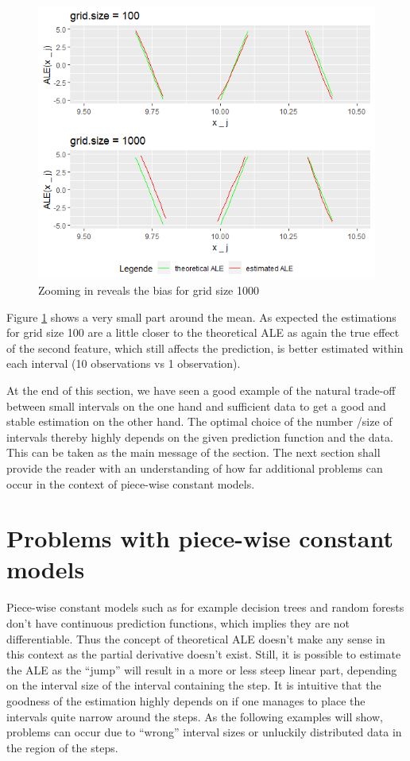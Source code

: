 \documentclass[]{krantz}
\begin{document}
\begin{figure}
\includegraphics[width=1\linewidth]{images/ALE_2_example3_zoom_} \caption{Zooming in reveals the bias for grid size 1000}\label{fig:example3zoom}
\end{figure}



Figure \ref{fig:example3zoom} shows a very small part around the mean.
As expected the estimations for grid size 100 are a little closer to the
theoretical ALE as again the true effect of the second feature, which
still affects the prediction, is better estimated within each interval
(10 observations vs 1 observation).

At the end of this section, we have seen a good example of the natural
trade-off between small intervals on the one hand and sufficient data to
get a good and stable estimation on the other hand. The optimal choice
of the number /size of intervals thereby highly depends on the given
prediction function and the data. This can be taken as the main message
of the section. The next section shall provide the reader with an
understanding of how far additional problems can occur in the context of
piece-wise constant models.

\section{Problems with piece-wise constant
models}\label{problems-with-piece-wise-constant-models}

Piece-wise constant models such as for example decision trees and random
forests don't have continuous prediction functions, which implies they
are not differentiable. Thus the concept of theoretical ALE doesn't make
any sense in this context as the partial derivative doesn't exist.
Still, it is possible to estimate the ALE as the ``jump'' will result in
a more or less steep linear part, depending on the interval size of the
interval containing the step. It is intuitive that the goodness of the
estimation highly depends on if one manages to place the intervals quite
narrow around the steps. As the following examples will show, problems
can occur due to ``wrong'' interval sizes or unluckily distributed data
in the region of the steps.
\end{document}
